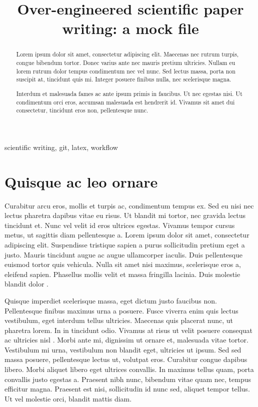 \documentclass[conference]{IEEEtran}
\begin{document}
\title{Over-engineered scientific paper writing: a mock file}


\author{
}

\maketitle

\begin{abstract}
Lorem ipsum dolor sit amet, consectetur adipiscing elit. Maecenas nec rutrum turpis, congue bibendum
tortor. Donec varius ante nec mauris pretium ultricies. Nullam eu lorem rutrum dolor tempus
condimentum nec vel nunc. Sed lectus massa, porta non suscipit at, tincidunt quis mi. Integer
posuere finibus nulla, nec scelerisque magna. 

Interdum et malesuada fames ac ante ipsum primis in faucibus. Ut nec egestas nisi. Ut condimentum
orci eros, accumsan malesuada est hendrerit id. Vivamus sit amet dui consectetur, tincidunt eros
non, pellentesque nunc. 
\end{abstract}

\begin{IEEEkeywords}
  scientific writing, git, latex, workflow
\end{IEEEkeywords}



\section{Quisque ac leo ornare}

Curabitur arcu eros, mollis et turpis ac, condimentum tempus ex. Sed eu nisi nec lectus pharetra
dapibus vitae eu risus. Ut blandit mi tortor, nec gravida lectus tincidunt et. Nunc vel velit id
eros ultrices egestas. Vivamus tempor cursus metus, ut sagittis diam pellentesque a. Lorem ipsum
dolor sit amet, consectetur adipiscing elit. Suspendisse tristique sapien a purus sollicitudin
pretium eget a justo. Mauris tincidunt augue ac augue ullamcorper iaculis. Duis pellentesque euismod
tortor quis vehicula. Nulla sit amet nisi maximus, scelerisque eros a, eleifend sapien. Phasellus
mollis velit et massa fringilla lacinia. Duis molestie blandit dolor \cite{Doe2020}.

Quisque imperdiet scelerisque massa, eget dictum justo faucibus non. Pellentesque finibus maximus
urna a posuere. Fusce viverra enim quis lectus vestibulum, eget interdum tellus ultricies. Maecenas
quis placerat nunc, ut pharetra lorem. In in tincidunt odio. Vivamus at risus ut velit posuere
consequat ac ultricies nisl \cite{Nadir2012}. Morbi ante mi, dignissim ut ornare et, malesuada vitae tortor.
Vestibulum mi urna, vestibulum non blandit eget, ultricies ut ipsum. Sed sed massa posuere,
pellentesque lectus ut, volutpat eros. Curabitur congue dapibus libero. Morbi aliquet libero eget
ultrices convallis. In maximus tellus quam, porta convallis justo egestas a. Praesent nibh nunc,
bibendum vitae quam nec, tempus efficitur magna. Praesent est nisi, sollicitudin id nunc sed,
aliquet tempor tellus. Ut vel molestie orci, blandit mattis diam.
\end{document}
